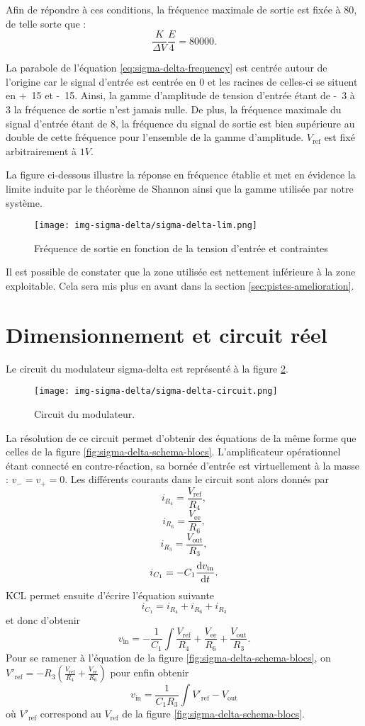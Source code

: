 Afin de répondre à ces conditions, la fréquence maximale de sortie est fixée à \unit{80}{\kilo\hertz},
de telle sorte que :
\[ \frac{K}{\Delta V}\frac{E}{4} = 80000. \]

La parabole de l'équation \ref{eq:sigma-delta-frequency} est centrée autour de l'origine car le signal
d'entrée est centrée en 0 et les racines de celles-ci se situent en \unit{+15}{\volt} et \unit{-15}{\volt}. 
Ainsi, la gamme d'amplitude de tension d'entrée étant de \unit{-3}{\volt} à \unit{3}{\volt} 
la fréquence de sortie n'est jamais nulle. De plus, la fréquence maximale du signal d'entrée étant de \unit{8}{\kilo\hertz}, 
la fréquence du signal de sortie est bien supérieure au double de cette fréquence pour l'ensemble de la gamme d'amplitude. 
$V_{\text{ref}}$ est fixé arbitrairement à $1V$.

La figure ci-dessous illustre la réponse en fréquence établie et met en évidence la limite induite par le 
théorème de Shannon ainsi que la gamme utilisée par notre système.

\begin{figure}[ht]
	\centering
	\texttt{[image: img-sigma-delta/sigma-delta-lim.png]}
	\caption{Fréquence de sortie en fonction de la tension d'entrée et contraintes}
	\label{fig:sigma-delta-lim}
\end{figure}

Il est possible de constater que la zone utilisée est nettement inférieure à la zone exploitable. 
Cela sera mis plus en avant dans la section \ref{sec:pistes-amelioration}.

\section{Dimensionnement et circuit réel}
Le circuit du modulateur sigma-delta est représenté
à la figure \ref{fig:sigma-delta-circuit}.

\begin{figure}[ht]
	\centering
	\texttt{[image: img-sigma-delta/sigma-delta-circuit.png]}
	\caption{Circuit du modulateur.}
	\label{fig:sigma-delta-circuit}
\end{figure}

La résolution de ce circuit permet d'obtenir des équations
de la même forme que celles de la figure
\ref{fig:sigma-delta-schema-blocs}.
L'amplificateur opérationnel étant connecté en contre-réaction,
sa bornée d'entrée est virtuellement à la masse : $v_- = v_+ = 0$.
Les différents courants dans le circuit sont alors donnés par
\[ i_{R_4} = \frac{V_{\text{ref}}}{R_4},\]
\[ i_{R_6} = \frac{V_{\text{ee}}}{R_6},\]
\[ i_{R_3} = \frac{V_{\text{out}}}{R_3},\]
\[ i_{C_1} = -C_1\frac{\operatorname{d}\! v_{\text{in}}}{\operatorname{d}\! t}.\]
KCL permet ensuite d'écrire l'équation suivante
\[ i_{C_1} = i_{R_4} + i_{R_6} + i_{R_3}\]
et donc d'obtenir
\[ v_{\text{in}} = -\frac{1}{C_1}\int \frac{V_{\text{ref}}}{R_4}
+ \frac{V_{\text{ee}}}{R_6} + \frac{V_{\text{out}}}{R_3}.\]
Pour se ramener à l'équation de la figure
\ref{fig:sigma-delta-schema-blocs}, on
$V'_{\text{ref}} = -R_3(\frac{V_{\text{ref}}}{R_4}+\frac{V_{\text{ee}}}{R_6})$
pour enfin obtenir
\[ v_{\text{in}} = \frac{1}{C_1R_3} \int V'_{\text{ref}} - V_{\text{out}}\]
où $V'_{\text{ref}}$ correspond au $V_{\text{ref}}$
de la figure \ref{fig:sigma-delta-schema-blocs}.

